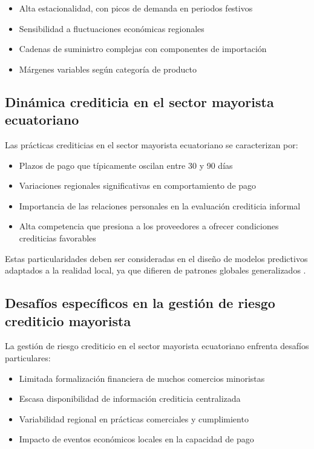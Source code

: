 \begin{itemize}
    \item Alta estacionalidad, con picos de demanda en periodos festivos
    \item Sensibilidad a fluctuaciones económicas regionales
    \item Cadenas de suministro complejas con componentes de importación
    \item Márgenes variables según categoría de producto
\end{itemize}

\subsection{Dinámica crediticia en el sector mayorista ecuatoriano}
Las prácticas crediticias en el sector mayorista ecuatoriano se caracterizan por:

\begin{itemize}
    \item Plazos de pago que típicamente oscilan entre 30 y 90 días
    \item Variaciones regionales significativas en comportamiento de pago
    \item Importancia de las relaciones personales en la evaluación crediticia informal
    \item Alta competencia que presiona a los proveedores a ofrecer condiciones crediticias favorables
\end{itemize}

Estas particularidades deben ser consideradas en el diseño de modelos predictivos adaptados a la realidad local, ya que difieren de patrones globales generalizados \cite{ramirez2023predictive}.

\subsection{Desafíos específicos en la gestión de riesgo crediticio mayorista}
La gestión de riesgo crediticio en el sector mayorista ecuatoriano enfrenta desafíos particulares:

\begin{itemize}
    \item Limitada formalización financiera de muchos comercios minoristas
    \item Escasa disponibilidad de información crediticia centralizada
    \item Variabilidad regional en prácticas comerciales y cumplimiento
    \item Impacto de eventos económicos locales en la capacidad de pago
\end{itemize}

